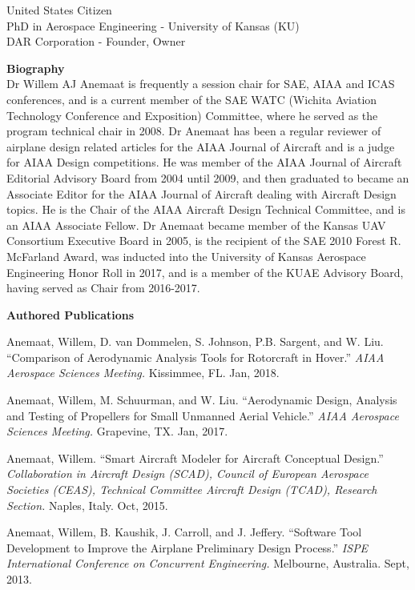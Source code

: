 \documentclass[11pt]{article}
\newcommand{\PubSpace}{\vspace{-0.12cm}}  %
\begin{document}
United States Citizen \\
PhD in Aerospace Engineering - University of Kansas (KU) \\
DAR Corporation - Founder, Owner


{\bf Biography} \\
Dr Willem AJ Anemaat is frequently a session chair for SAE, AIAA and ICAS conferences, and is a current member of the SAE WATC (Wichita Aviation Technology Conference and Exposition) Committee, where he served as the program technical chair in 2008.  Dr Anemaat has been a regular reviewer of airplane design related articles for the AIAA Journal of Aircraft and is a judge for AIAA Design competitions.  He was member of the AIAA Journal of Aircraft Editorial Advisory Board from 2004 until 2009, and then graduated to became an Associate Editor for the AIAA Journal of Aircraft dealing with Aircraft Design topics.  He is the Chair of the AIAA Aircraft Design Technical Committee, and is an AIAA Associate Fellow.  Dr Anemaat became member of the Kansas UAV Consortium Executive Board in 2005, is the recipient of the SAE 2010 Forest R. McFarland Award, was inducted into the University of Kansas Aerospace Engineering Honor Roll in 2017, and is a member of the KUAE Advisory Board, having served as Chair from 2016-2017.


{\bf Authored Publications} \\
\vspace{-0.2in}

\PubSpace
Anemaat, Willem, D. van Dommelen, S. Johnson, P.B. Sargent, and W. Liu.
``Comparison of Aerodynamic Analysis Tools for Rotorcraft in Hover.''
\emph{AIAA Aerospace Sciences Meeting.}
Kissimmee, FL.
Jan, 2018.

\PubSpace
Anemaat, Willem, M. Schuurman, and W. Liu.
``Aerodynamic Design, Analysis and Testing of Propellers for Small Unmanned Aerial Vehicle.''
\emph{AIAA Aerospace Sciences Meeting.}
Grapevine, TX.
Jan, 2017.

\PubSpace
Anemaat, Willem.
``Smart Aircraft Modeler for Aircraft Conceptual Design.''
\emph{Collaboration in Aircraft Design (SCAD), Council of European Aerospace Societies (CEAS), Technical Committee Aircraft Design (TCAD), Research Section.}
Naples, Italy.
Oct, 2015.

\PubSpace
Anemaat, Willem, B. Kaushik, J. Carroll, and J. Jeffery.
``Software Tool Development to Improve the Airplane Preliminary Design Process.''
\emph{ISPE International Conference on Concurrent Engineering.}
Melbourne, Australia.
Sept, 2013.
\end{document}
